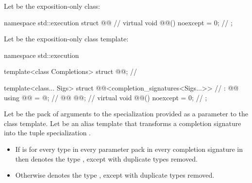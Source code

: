 \pnum
Let  be the exposition-only class:

%
\begin{codeblock}
namespace std::execution {
  struct @@ {                                           // \expos
    virtual void @@() noexcept = 0;                         // \expos
  };
}
\end{codeblock}

\pnum
Let  be the exposition-only class template:

%
\begin{codeblock}
namespace std::execution {
  template<class Completions>
  struct @@;                                   // \expos

  template<class... Sigs>
  struct @@<completion_signatures<Sigs...>>    // \expos
    : @@ {
    using @@ = @\seebelow@;                                    // \expos
    @@ @@;                                               // \expos
    virtual void @@() noexcept = 0;                           // \expos
  };
}
\end{codeblock}

\pnum
Let  be the pack of arguments to
the  specialization provided as
a parameter to the  class template.
Let  be an alias template that
transforms a completion signature 
into the tuple specialization .

\begin{itemize}
\item
If  is 
for every type 
in every parameter pack 
in every completion signature 
in  then
 denotes the type
,
except with duplicate types removed.

\item
Otherwise
 denotes the type
,
except with duplicate types removed.
\end{itemize}


